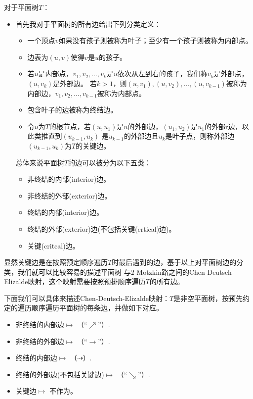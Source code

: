 对于平面树$T$：
\begin{itemize}
\item 首先我对于平面树的所有边给出下列分类定义：
\begin{itemize}
\item 一个顶点$v$如果没有孩子则被称为叶子；至少有一个孩子则被称为内部点。
\item 边表为$(u,v)$使得$v$是$u$的孩子。
\item 若$u$是内部点，$v_1,v_2,\ldots,v_k$是$u$依次从左到右的孩子，我们称$v_k$是外部点，$(u,v_k)$是外部边。
      若$k>1$，则$(u,v_1),(u,v_2),\ldots,(u,v_{k-1})$被称为内部边，$v_1,v_2,\ldots,v_{k-1}$被称为内部点。
\item 包含叶子的边被称为终结边。
\item 令$u$为$T$的根节点，若$(u,u_1)$是$u$的外部边，$(u_1,u_2)$是$u_1$的外部r边，以此类推直到$(u_{k-1},u_k)$
    是$u_{k-1}$的外部边且$u_k$是叶子点，则称外部边$(u_{k-1},u_k)$为$T$的关键边。
\end{itemize}
总体来说平面树$T$的边可以被分为以下五类：
\begin{itemize}
\item 非终结的内部(interior)边。
\item 非终结的外部(exterior)边。
\item 终结的内部(interior)边。
\item 终结的外部(exterior)边(不包括关键(crtical)边)。
\item 关键(critcal)边。
\end{itemize}
\end{itemize}

显然关键边是在按照预定顺序遍历$T$时最后遇到的边，基于以上对平面树边的分类，我们就可以比较容易的描述平面树
与$2$-Motzkin路之间的Chen-Deutsch-Elizalde映射，这个映射需要按照预排顺序遍历$T$的所有边。

下面我们可以具体来描述Chen-Deutsch-Elizalde映射：$T$是非空平面树，按预先约定的遍历顺序遍历平面树的每条边，并做如下对应。
\begin{itemize}
\item 非终结的内部边$\mapsto$ （“$\nearrow$”）.
\item 非终结的外部边$\mapsto$ （“$\longrightarrow$”）.
\item 终结的内部边$\mapsto$    （$\dashrightarrow$）.
\item 终结的外部边(不包括关键边)$\mapsto$  （“$\searrow$”）.
\item 关键边$\mapsto$  不作为。
\end{itemize}

